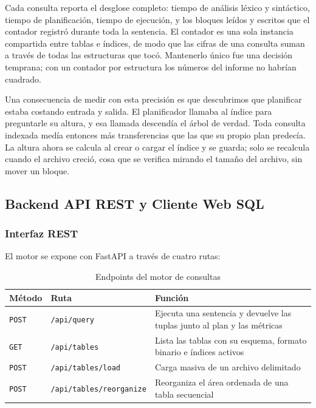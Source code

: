 \documentclass[a4paper,12pt]{article}
\begin{document}
Cada consulta reporta el desglose completo: tiempo de análisis léxico y
sintáctico, tiempo de planificación, tiempo de ejecución, y los bloques leídos y
escritos que el contador registró durante toda la sentencia. El contador es una
sola instancia compartida entre tablas e índices, de modo que las cifras de una
consulta suman a través de todas las estructuras que tocó. Mantenerlo único fue
una decisión temprana; con un contador por estructura los números del informe no
habrían cuadrado.

Una consecuencia de medir con esta precisión es que descubrimos que planificar
estaba costando entrada y salida. El planificador llamaba al índice para
preguntarle su altura, y esa llamada descendía el árbol de verdad. Toda consulta
indexada medía entonces más transferencias que las que su propio plan predecía.
La altura ahora se calcula al crear o cargar el índice y se guarda; solo se
recalcula cuando el archivo creció, cosa que se verifica mirando el tamaño del
archivo, sin mover un bloque.

\subsection{Backend API REST y Cliente Web SQL}

\subsubsection{Interfaz REST}

El motor se expone con FastAPI a través de cuatro rutas:

\begin{table}[H]
\centering
\caption{Endpoints del motor de consultas}
\begin{tabularx}{\textwidth}{@{}llX@{}}
\toprule
\textbf{Método} & \textbf{Ruta} & \textbf{Función} \\
\midrule
\texttt{POST} & \texttt{/api/query} & Ejecuta una sentencia y devuelve las tuplas junto al plan y las métricas \\
\texttt{GET} & \texttt{/api/tables} & Lista las tablas con su esquema, formato binario e índices activos \\
\texttt{POST} & \texttt{/api/tables/load} & Carga masiva de un archivo delimitado \\
\texttt{POST} & \texttt{/api/tables/reorganize} & Reorganiza el área ordenada de una tabla secuencial \\
\bottomrule
\end{tabularx}
\end{table}
\end{document}
